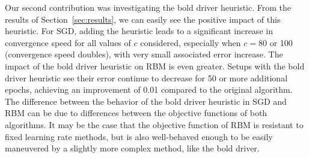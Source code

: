 \documentclass[10pt,conference,compsocconf]{IEEEtran}
\begin{document}
	Our second contribution was investigating the bold driver heuristic. From the results of Section~\ref{sec:results}, we can easily see the positive impact of this heuristic. For SGD, adding the heuristic leads to a significant increase in convergence speed for all values of $c$ considered, especially when $c=80$ or 100 (convergence speed doubles), with very small associated error increase. The impact of the bold driver heuristic on RBM is even greater. Setups with the bold driver heuristic see their error continue to decrease for 50 or more additional epochs, achieving an improvement of 0.01 compared to the original algorithm. The difference between the behavior of the bold driver heuristic in SGD and RBM can be due to differences between the objective functions of both algorithms. It may be the case that the objective function of RBM is resistant to fixed learning rate methods, but is also well-behaved enough to be easily maneuvered by a slightly more complex method, like the bold driver.
	
%	
	
\end{document}
